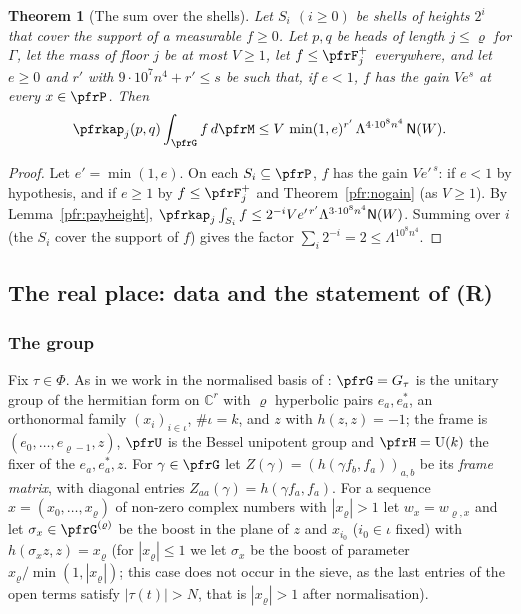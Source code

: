 \documentclass[10pt]{amsart}
\newtheorem{theorem}{Theorem}[section]
\theoremstyle{definition}
\theoremstyle{remark}
\newcommand{\C}{\mathbb C}
\providecommand{\auPl}{\Phi}
\providecommand{\auU}{\mathrm U}
\begin{document}
\begin{theorem}[The sum over the shells]\label{pfr:shells}
Let $S_i$ $(i\ge0)$ be shells of heights $2^i$ that cover the support of a measurable $f\ge0$. Let $p,q$
be heads of length $j\le\varrho$ for $\Gamma$, let the mass of floor $j$ be at most $V\ge1$, let $f\le
\pfrF_j^+$ everywhere, and let $e\ge0$ and $r'$ with $9\cdot10^7n^4+r'\le s$ be such that, if $e<1$, $f$
has the gain $Ve^{s}$ at every $x\in\pfrP$. Then
\[
\pfrkap_j(p,q)\int_\pfrG f\,d\pfrM\le V\,\min(1,e)^{r'}\,\Lambda^{4\cdot10^8n^4}\,\mathsf N(W).
\]
\end{theorem}
\begin{proof}
Let $e'=\min(1,e)$. On each $S_i\subseteq\pfrP$, $f$ has the gain $Ve'^{\,s}$: if $e<1$ by hypothesis,
and if $e\ge1$ by $f\le\pfrF^+_j$ and Theorem~\ref{pfr:nogain} (as $V\ge1$). By
Lemma~\ref{pfr:payheight}, $\pfrkap_j\int_{S_i}f\le2^{-i}Ve'^{\,r'}\Lambda^{3\cdot10^8n^4}\mathsf N(W)$. Summing
over $i$ (the $S_i$ cover the support of $f$) gives the factor $\sum_i2^{-i}=2\le\Lambda^{10^8n^4}$.
\end{proof}

\subsection{The real place: data and the statement of \textup{(R)}}\label{pfr:ss-realdata}

\subsubsection*{The group}
Fix $\tau\in\auPl$. As in {\cite[\S3.3.7]{P51}} we work in the normalised basis of
{\cite[\S3.2.1]{P51}}: $\pfrG=G_\tau$ is the unitary group of the hermitian form on $\C^r$ with $\varrho$
hyperbolic pairs $e_a,e_a^*$, an orthonormal family $(x_i)_{i\in\iota}$, $\#\iota=k$, and $z$ with
$h(z,z)=-1$; the frame is $(e_0,\dots,e_{\varrho-1},z)$, $\pfrU$ is the Bessel unipotent group and
$\pfrH=\auU(k)$ the fixer of the $e_a,e_a^*,z$. For $\gamma\in\pfrG$ let $Z(\gamma)=(h(\gamma f_b,f_a))_{a,b}$
be its \emph{frame matrix}, with diagonal entries $Z_{aa}(\gamma)=h(\gamma f_a,f_a)$. For a sequence
$x=(x_0,\dots,x_\varrho)$ of non-zero complex numbers with $|x_\varrho|>1$ let $w_x=w_{\varrho,x}$ and let
$\sigma_x\in\pfrG^{(\varrho)}$ be the boost in the plane of $z$ and $x_{i_0}$ ($i_0\in\iota$ fixed) with
$h(\sigma_xz,z)=x_\varrho$ (for $|x_\varrho|\le1$ we let $\sigma_x$ be the boost of parameter
$x_\varrho/\min(1,|x_\varrho|)$; this case does not occur in the sieve, as the last entries of the
open terms satisfy $|\tau(t)|>N$, that is $|x_\varrho|>1$ after normalisation).
\end{document}
